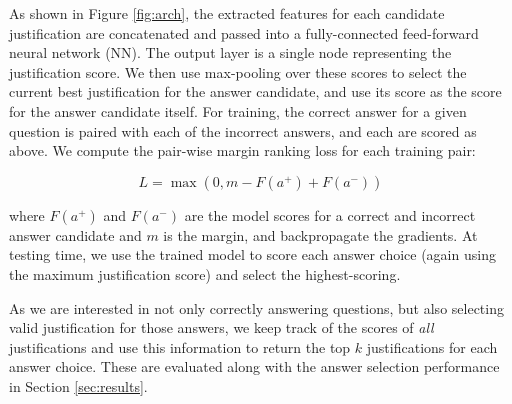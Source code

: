 As shown in Figure \ref{fig:arch}, the extracted features for each candidate justification are concatenated and passed into a fully-connected feed-forward neural network (NN).  The output layer is a single node representing the justification score.  We then use max-pooling over these scores to select the current best justification for the answer candidate, and use its score as the score for the answer candidate itself.  For training, the correct answer for a given question is paired with each of the incorrect answers, and each are scored as above.  We compute the pair-wise margin ranking loss for each training pair:
\vspace{-2mm}

\begin{footnotesize}
\begin{equation}
L = \max(0, m - F(a^{+}) + F(a^{-}))
\end{equation}
\end{footnotesize}where $F(a^+)$ and $F(a^-)$ are the model scores for a correct and incorrect answer candidate and $m$ is the margin, and backpropagate the gradients.
At testing time, we use the trained model to score each answer choice (again using the maximum justification score) and select the highest-scoring.

As we are interested in not only correctly answering questions, but also selecting valid justification for those answers, we keep track of the scores of \emph{all} justifications and use this information to return the top $k$ justifications for each answer choice.  These are evaluated along with the answer selection performance in Section \ref{sec:results}.
